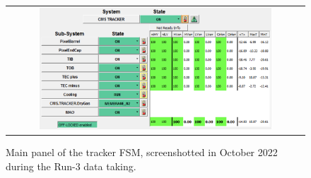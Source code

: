 \begin{figure}[tbh!]
 \begin{center}
 \begin{tabular}{c}
 \includegraphics[width=0.8\textwidth]{figures/Part2/Operation/TrackerDCS}
 \end{tabular}
 \caption{Main panel of the tracker \ac{FSM}, screenshotted in October 2022 during the Run-3 data taking.}
 \label{fig:DCS}
 \end{center}
\end{figure}